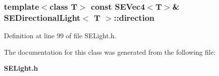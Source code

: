 \subsubsection[{direction}]{\setlength{\rightskip}{0pt plus 5cm}template$<$class T$>$ const {\bf S\+E\+Vec4}$<$T$>$\& {\bf S\+E\+Directional\+Light}$<$ T $>$\+::direction}\label{class_s_e_directional_light_a2454d3ab0e43066d8e387ef13b7e27e3}


Definition at line 99 of file S\+E\+Light.\+h.



The documentation for this class was generated from the following file\+:\begin{DoxyCompactItemize}
\item 
{\bf S\+E\+Light.\+h}\end{DoxyCompactItemize}

